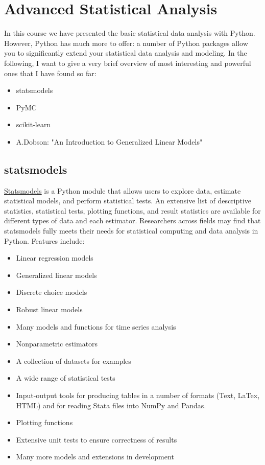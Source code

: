 \chapter{Advanced Statistical Analysis}

In this course we have presented the basic statistical data analysis with Python. However, Python has much more to offer: a number of Python packages allow you to significantly extend your statistical data analysis and modeling. In the following, I want to give a very brief overview of most interesting and powerful ones that I have found so far:

\begin{itemize}
  \item statsmodels
  \item PyMC
  \item scikit-learn
  \item A.Dobson: "An Introduction to Generalized Linear Models"
\end{itemize}

\section{statsmodels}

\href{http://statsmodels.sourceforge.net/}{Statsmodels} is a Python module that allows users to explore data, estimate statistical models, and perform statistical tests. An extensive list of descriptive statistics, statistical tests, plotting functions, and result statistics are available for different types of data and each estimator. Researchers across fields may find that statsmodels fully meets their needs for statistical computing and data analysis in Python. Features include:

\begin{itemize}
  \item Linear regression models
  \item Generalized linear models
  \item Discrete choice models
  \item Robust linear models
  \item Many models and functions for time series analysis
  \item Nonparametric estimators
  \item A collection of datasets for examples
  \item A wide range of statistical tests
  \item Input-output tools for producing tables in a number of formats (Text, LaTex, HTML) and for reading Stata files into NumPy and Pandas.
  \item Plotting functions
  \item Extensive unit tests to ensure correctness of results
  \item Many more models and extensions in development
\end{itemize}

